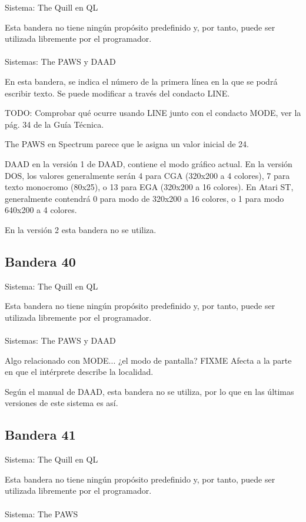 \documentclass[11pt, a5paper]{article}
\newcommand{\quill}{\textsf{The Quill}\xspace}
\newcommand{\paw}{\textsf{The PAWS}\xspace}
\newcommand{\daad}{\textsf{DAAD}\xspace}
\newcommand{\sistema}[1]{\noindent Sistema: #1 \nopagebreak}
\newcommand{\sistemas}[1]{\noindent Sistemas: #1 \nopagebreak}
\begin{document}
\sistema{\quill en QL}

Esta bandera no tiene ningún propósito predefinido y, por tanto, puede ser utilizada libremente por el programador.
\\\ \\
\sistemas{\paw y \daad}

En esta bandera, se indica el número de la primera línea en la que se podrá escribir texto. Se puede modificar a través del condacto LINE.

TODO: Comprobar qué ocurre usando LINE junto con el condacto MODE, ver la pág. 34 de la Guía Técnica.

\paw en Spectrum parece que le asigna un valor inicial de 24.

\daad en la versión 1 de \daad, contiene el modo gráfico actual. En la versión DOS, los valores generalmente serán 4 para CGA (320x200 a 4 colores), 7 para texto monocromo (80x25), o 13 para EGA (320x200 a 16 colores). En Atari ST, generalmente contendrá 0 para modo de 320x200 a 16 colores, o 1 para modo 640x200 a 4 colores.

En la versión 2 esta bandera no se utiliza.

\subsection{Bandera 40}

\sistema{\quill en QL}

Esta bandera no tiene ningún propósito predefinido y, por tanto, puede ser utilizada libremente por el programador.
\\\ \\
\sistemas{\paw y \daad}

Algo relacionado con MODE... ¿el modo de pantalla? FIXME
Afecta a la parte en que el intérprete describe la localidad.

Según el manual de \daad, esta bandera no se utiliza, por lo que en las últimas versiones de este sistema es así.

\subsection{Bandera 41}

\sistema{\quill en QL}

Esta bandera no tiene ningún propósito predefinido y, por tanto, puede ser utilizada libremente por el programador.
\\\ \\
\sistema{\paw}
\end{document}
